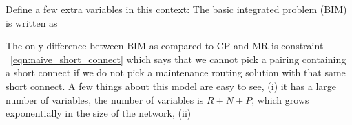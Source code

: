 \documentclass[letterpaper, 10pt, twocolumn, reqno]{amsart}
\begin{document}
Define a few extra variables in this context:
The basic integrated problem (BIM) is written as

The only difference between BIM as compared to CP and MR is constraint ~\eqref{eqn:naive_short_connect} which says that we cannot pick a pairing containing a short connect if we do not pick a maintenance routing solution with that same short connect. A few things about this model are easy to see, (i) it has a large number of variables, the number of variables is $R + N+P$, which grows exponentially in the size of the network, (ii) 
\end{document}
